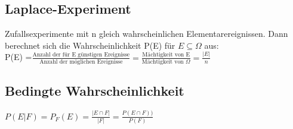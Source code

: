   \subsection{Laplace-Experiment}
  Zufallsexperimente mit n gleich wahrscheinlichen Elementarereignissen. Dann berechnet sich die Wahrscheinlichkeit P(E) für $E \subseteq \Omega$ aus:\\
  P(E) =$\frac{\text{Anzahl der für E günstigen Ereignisse}}{\text{Anzahl der möglichen Ereignisse}} = \frac{\text{Mächtigkeit von E}}{\text{Mächtigkeit von } \Omega} = \frac{|E|}{n}$
  \subsection{Bedingte Wahrscheinlichkeit}
  $P(E|F) = P_{F}(E) = \frac{|E \cap F| }{|F|} = \frac{P(E\cap F))}{P(F)}$
